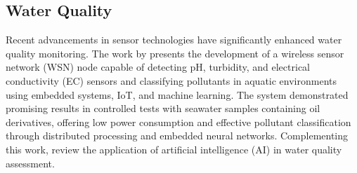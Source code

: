 \documentclass[conference]{IEEEtran}
\begin{document}



\subsection{Water Quality}

Recent advancements in sensor technologies have significantly enhanced water quality monitoring. The work by \cite{ferreira_2023_conception} presents the development of a wireless sensor network (WSN) node capable of detecting pH, turbidity, and electrical conductivity (EC) sensors and classifying pollutants in aquatic environments using embedded systems, IoT, and machine learning. The system demonstrated promising results in controlled tests with seawater samples containing oil derivatives, offering low power consumption and effective pollutant classification through distributed processing and embedded neural networks. Complementing this work, \cite{nr_2025_ai} review the application of artificial intelligence (AI) in water quality assessment.
\end{document}
